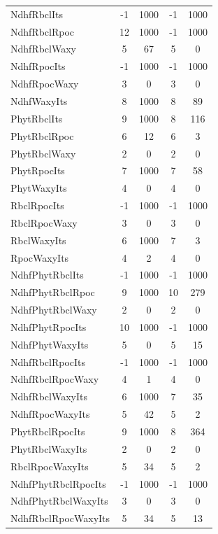 \begin{table}[h!]
{\begin{tabular}{l|c|c|c|c}
NdhfRbclIts         & -1       & 1000  & -1   & 1000  \\
NdhfRbclRpoc        & 12       & 1000  & -1   & 1000  \\
NdhfRbclWaxy        & 5        & 67    & 5    & 0     \\
NdhfRpocIts         & -1       & 1000  & -1   & 1000  \\
NdhfRpocWaxy        & 3        & 0     & 3    & 0     \\
NdhfWaxyIts         & 8        & 1000  & 8    & 89    \\
PhytRbclIts         & 9        & 1000  & 8    & 116   \\
PhytRbclRpoc        & 6        & 12    & 6    & 3     \\
PhytRbclWaxy        & 2        & 0     & 2    & 0     \\
PhytRpocIts         & 7        & 1000  & 7    & 58    \\
PhytWaxyIts         & 4        & 0     & 4    & 0     \\
RbclRpocIts         & -1       & 1000  & -1   & 1000  \\
RbclRpocWaxy        & 3        & 0     & 3    & 0     \\
RbclWaxyIts         & 6        & 1000  & 7    & 3     \\
RpocWaxyIts         & 4        & 2     & 4    & 0     \\
NdhfPhytRbclIts     & -1       & 1000  & -1   & 1000  \\
NdhfPhytRbclRpoc    & 9        & 1000  & 10   & 279   \\
NdhfPhytRbclWaxy    & 2        & 0     & 2    & 0     \\
NdhfPhytRpocIts     & 10       & 1000  & -1   & 1000  \\
NdhfPhytWaxyIts     & 5        & 0     & 5    & 15    \\
NdhfRbclRpocIts     & -1       & 1000  & -1   & 1000  \\
NdhfRbclRpocWaxy    & 4        & 1     & 4    & 0     \\
NdhfRbclWaxyIts     & 6        & 1000  & 7    & 35    \\
NdhfRpocWaxyIts     & 5        & 42    & 5    & 2     \\
PhytRbclRpocIts     & 9        & 1000  & 8    & 364   \\
PhytRbclWaxyIts     & 2        & 0     & 2    & 0     \\
RbclRpocWaxyIts     & 5        & 34    & 5    & 2     \\
NdhfPhytRbclRpocIts & -1       & 1000  & -1   & 1000  \\
NdhfPhytRbclWaxyIts & 3        & 0     & 3    & 0     \\
NdhfRbclRpocWaxyIts & 5        & 34    & 5    & 13    \\
\end{tabular}
}
\end{table}
